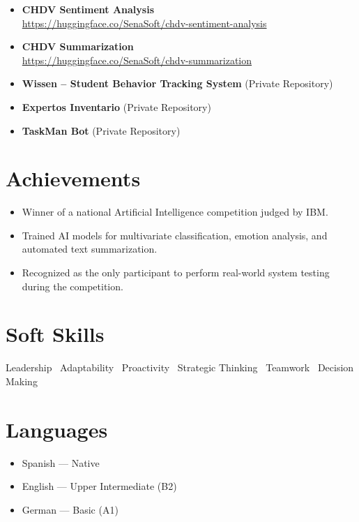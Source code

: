 \documentclass[11pt,a4paper]{article}
\begin{document}
\begin{itemize}
    \item \textbf{CHDV Sentiment Analysis}\\
    \url{https://huggingface.co/SenaSoft/chdv-sentiment-analysis}

    \item \textbf{CHDV Summarization}\\
    \url{https://huggingface.co/SenaSoft/chdv-summarization}

    \item \textbf{Wissen – Student Behavior Tracking System} (Private Repository)

    \item \textbf{Expertos Inventario} (Private Repository)

    \item \textbf{TaskMan Bot} (Private Repository)
\end{itemize}

\section*{Achievements}

\begin{itemize}
    \item Winner of a national Artificial Intelligence competition judged by IBM.
    \item Trained AI models for multivariate classification, emotion analysis, and automated text summarization.
    \item Recognized as the only participant to perform real-world system testing during the competition.
\end{itemize}

\section*{Soft Skills}

Leadership \textbullet\ Adaptability \textbullet\ Proactivity \textbullet\ Strategic Thinking \textbullet\ Teamwork \textbullet\ Decision Making

\section*{Languages}

\begin{itemize}
    \item Spanish — Native
    \item English — Upper Intermediate (B2)
    \item German — Basic (A1)
\end{itemize}
\end{document}
